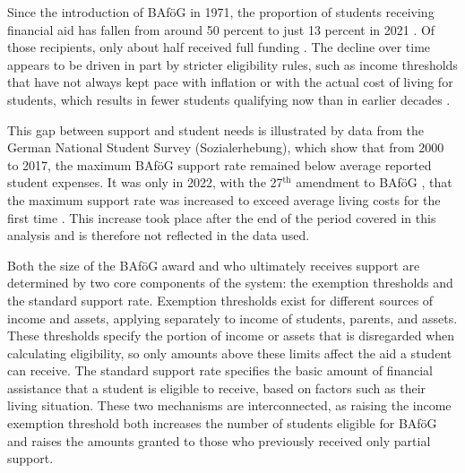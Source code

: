 Since the introduction of BAföG in 1971, the proportion of students receiving financial aid has fallen from around 50 percent to just 13 percent in 2021 \citep{kroher_studierendenbefragung_2023}. 
Of those recipients, only about half received full funding \citep{meier_zur_2024}. 
The decline over time appears to be driven in part by stricter eligibility rules, such as income thresholds that have not always kept pace with inflation or with the actual cost of living for students, which results in fewer students qualifying now than in earlier decades \citep{meier_zur_2024}.

This gap between support and student needs is illustrated by data from the German National Student Survey (Sozialerhebung), which show that from 2000 to 2017, the maximum BAföG support rate remained below average reported student expenses. 
It was only in 2022, with the 27\(^{\text{th}}\) amendment to BAföG \citep{bafoeg27}, that the maximum support rate was increased to exceed average living costs for the first time \citep{meier_bafog_2024, meier_zur_2024}.
This increase took place after the end of the period covered in this analysis and is therefore not reflected in the data used.

Both the size of the BAföG award and who ultimately receives support are determined by two core components of the system: the exemption thresholds and the standard support rate. 
Exemption thresholds exist for different sources of income and assets, applying separately to income of students, parents, and assets. 
These thresholds specify the portion of income or assets that is disregarded when calculating eligibility, so only amounts above these limits affect the aid a student can receive. 
The standard support rate specifies the basic amount of financial assistance that a student is eligible to receive, based on factors such as their living situation.
These two mechanisms are interconnected, as raising the income exemption threshold both increases the number of students eligible for BAföG and raises the amounts granted to those who previously received only partial support. 

